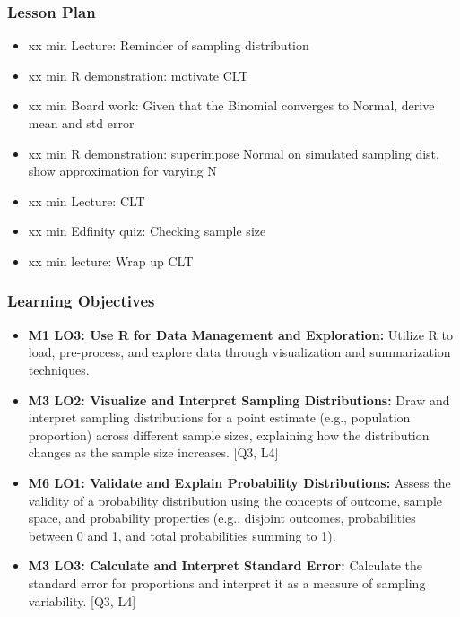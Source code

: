 

\begin{frame}
\frametitle{Lesson Plan}
\begin{itemize}
    \item xx min Lecture: Reminder of sampling distribution
    \item xx min R demonstration: motivate CLT
    \item xx min Board work: Given that the Binomial converges to Normal, derive mean and std error
    \item xx min R demonstration: superimpose Normal on simulated sampling dist, show approximation for varying N
    \item xx min Lecture: CLT
    \item xx min Edfinity quiz: Checking sample size
    \item xx min lecture: Wrap up CLT
 \end{itemize}
\end{frame}
    
\begin{frame}
\frametitle{Learning Objectives}
\begin{itemize}
    \item \textbf{M1 LO3: Use R for Data Management and Exploration:} Utilize R to load, pre-process, and explore data through visualization and summarization techniques.
    \item \textbf{M3 LO2: Visualize and Interpret Sampling Distributions:} Draw and interpret sampling distributions for a point estimate (e.g., population proportion) across different sample sizes, explaining how the distribution changes as the sample size increases. [Q3, L4]     \item \textbf{M6 LO1: Validate and Explain Probability Distributions:} Assess the validity of a probability distribution using the concepts of outcome, sample space, and probability properties (e.g., disjoint outcomes, probabilities between 0 and 1, and total probabilities summing to 1).
    \item \textbf{M3 LO3: Calculate and Interpret Standard Error:} Calculate the standard error for proportions and interpret it as a measure of sampling variability. [Q3, L4]
\end{itemize}
\end{frame}


